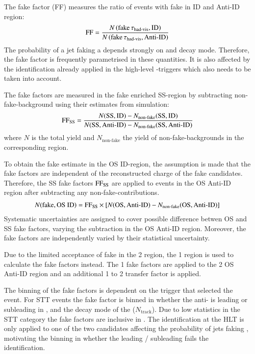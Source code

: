 The fake factor (FF) measures the ratio of events with fake \tauhadvis in ID and
Anti-ID region:
\begin{align*}
  \text{FF} = \frac{N\left( \text{fake} \, \tau_{\text{had-vis}}, \text{ID} \right)}{N\left( \text{fake} \, \tau_{\text{had-vis}}, \text{Anti-ID} \right)}
\end{align*}
The probability of a jet faking a \tauhadvis depends strongly on \tauhadvis \pT
and decay mode. Therefore, the fake factor is frequently parametrised in these
quantities. It is also affected by the \tauhadvis identification already applied
in the high-level \tauhadvis-triggers which also needs to be taken into account.

The fake factors are measured in the fake enriched SS-region by subtracting
non-fake-\tauhadvis background using their estimates from simulation:
\begin{align*}
  \text{FF}_\text{SS} = \frac{N(\text{SS}, \text{ID}) - N_\text{non-fake}(\text{SS}, \text{ID})}{N(\text{SS}, \text{Anti-ID}) - N_\text{non-fake}(\text{SS}, \text{Anti-ID})}
\end{align*}
where $N$ is the total yield and $N_\text{non-fake}$ the yield of
non-fake-\tauhadvis backgrounds in the corresponding region.

To obtain the fake \tauhadvis estimate in the OS ID-region, the assumption is
made that the fake factors are independent of the reconstructed charge of the
fake \tauhadvis candidates. Therefore, the SS fake factors $\text{FF}_\text{SS}$ are
applied to events in the OS Anti-ID region after subtracting any
non-fake-\tauhadvis contributions.
\begin{align*}
  N(\text{fake}, \text{OS ID}) = \text{FF}_\text{SS} \times \left[ N(\text{OS}, \text{Anti-ID}) - N_\text{non-fake}(\text{OS}, \text{Anti-ID}) \right]
\end{align*}
Systematic uncertainties are assigned to
cover possible difference betwen OS and SS fake factors, varying the
subtraction in the OS Anti-ID region. Moreover, the fake factors are
independently varied by their statistical uncertainty.

Due to the limited acceptance of fake \tauhadvis in the 2 \btag region, the 1
\btag region is used to calculate the fake factors instead. The 1 \btag fake
factors are applied to the 2 \btag OS Anti-ID region and an additional 1 to 2
\btag transfer factor is applied.

The binning of the fake factors is dependent on the trigger that selected the
event. For STT events the fake factor is binned in whether the anti-\tauhadvis
is leading or subleading in \pT, and the decay mode of the \tauhadvis
($N_\text{track}$). Due to low statistics in the STT category the fake factors
are inclusive in \tauhadvis \pT. The \tauhadvis identification at the HLT is
only applied to one of the two \tauhadvis candidates affecting the probability
of jets faking \tauhadvis, motivating the binning in whether the leading /
subleading \tauhadvis fails the identification.

